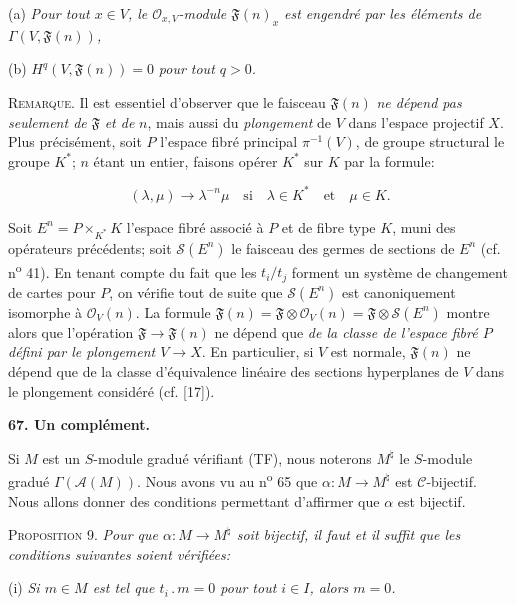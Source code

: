 (a) \textit{Pour tout $x \in V$, le $\mathcal{O}_{x,V}$-module $\mathfrak{F}(n)_x$ est engendré par les éléments de $\Gamma(V, \mathfrak{F}(n))$,}

(b) $H^q(V, \mathfrak{F}(n)) = 0$ \textit{pour tout $q > 0$.}

\textsc{Remarque}. Il est essentiel d'observer que le faisceau $\mathfrak{F}(n)$ \textit{ne dépend pas seulement de} $\mathfrak{F}$ \textit{et de} $n$, mais aussi du \textit{plongement} de $V$ dans l'espace projectif $X$. Plus précisément, soit $P$ l'espace fibré principal $\pi^{-1}(V)$, de groupe structural le groupe $K^*$; $n$ étant un entier, faisons opérer $K^*$ sur $K$ par la formule:

\begin{equation*}
(\lambda, \mu) \to \lambda^{-n}\mu \quad \mathrm{si} \quad \lambda \in K^* \quad \mathrm{et} \quad \mu \in K.
\end{equation*}


Soit $E^n = P \times_{K^*} K$ l'espace fibré associé à $P$ et de fibre type $K$, muni des opérateurs précédents; soit $\mathcal{S}(E^n)$ le faisceau des germes de sections de $E^n$ (cf. n\textsuperscript{o} 41). En tenant compte du fait que les $t_i/t_j$ forment un système de changement de cartes pour $P$, on vérifie tout de suite que $\mathcal{S}(E^n)$ est canoniquement isomorphe à $\mathcal{O}_V(n)$. La formule $\mathfrak{F}(n) = \mathfrak{F} \otimes \mathcal{O}_V(n) = \mathfrak{F} \otimes \mathcal{S}(E^n)$ montre alors que l'opération $\mathfrak{F} \to \mathfrak{F}(n)$ ne dépend que \textit{de la classe de l'espace fibré $P$ défini par le plongement $V \to X$}. En particulier, si $V$ est normale, $\mathfrak{F}(n)$ ne dépend que de la classe d'équivalence linéaire des sections hyperplanes de $V$ dans le plongement considéré (cf. [17]).


\textbf{67. Un complément.}

Si $M$ est un $S$-module gradué vérifiant (TF), nous noterons $M^\natural$ le $S$-module gradué $\Gamma(\mathcal{A}(M))$. Nous avons vu au n\textsuperscript{o} 65 que $\alpha : M \to M^\natural$ est $\mathcal{C}$-bijectif. Nous allons donner des conditions permettant d'affirmer que $\alpha$ est bijectif.

\textsc{Proposition} 9. \textit{Pour que $\alpha : M \to M^\natural$ soit bijectif, il faut et il suffit que les conditions suivantes soient vérifiées:}

(i) \textit{Si $m \in M$ est tel que $t_i\,.\,m = 0$ pour tout $i \in I$, alors $m = 0$.}

